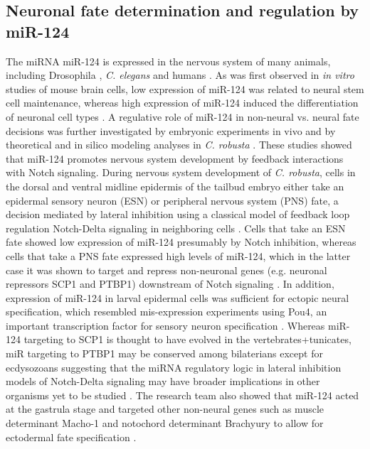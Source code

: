 \documentclass[graybox]{svmult}
\begin{document}
\subsection{Neuronal fate determination and regulation by miR-124}

The miRNA miR-124 is expressed in the nervous system of many animals, including 
Drosophila \citep{Aboobaker18017}, \textit{C. elegans} \citep{Clark:2010} and 
humans \citep{Sempere2004}. As was first observed in \textit{in vitro} studies 
of mouse 
brain cells, low expression of miR-124 was related to neural stem cell 
maintenance, whereas high expression of miR-124 induced the differentiation of 
neuronal cell types \citep{Cheng:2009qf}. A regulative role of 
miR-124 in non-neural vs. neural fate decisions was further investigated by 
embryonic experiments in vivo \citep{Chen4943} and by 
theoretical and in silico modeling analyses in \textit{C. robusta} 
\citep{Chen2014}. These studies showed that miR-124 promotes 
nervous system development by feedback interactions with Notch signaling. 
During nervous system development of \textit{C. robusta}, cells in the dorsal 
and ventral midline epidermis of the tailbud embryo either take an epidermal 
sensory neuron (ESN) or peripheral nervous system (PNS) fate, a decision 
mediated by lateral inhibition using a classical model of feedback loop 
regulation Notch-Delta signaling in neighboring cells \citep{Collier:1996, 
Chen2014}. Cells that take an ESN fate showed low expression of miR-124 
presumably by Notch inhibition, whereas cells that take a PNS fate expressed 
high levels of miR-124, which in the latter case it was shown to target and 
repress non-neuronal genes (e.g. neuronal repressors SCP1 and PTBP1) downstream 
of Notch signaling \citep{Chen4943}. In addition, expression 
of miR-124 in larval epidermal cells was sufficient for ectopic neural 
specification, which resembled mis-expression experiments using Pou4, an 
important transcription factor for sensory neuron specification 
\citep{Chen4943, JoyceTang2013}. Whereas miR-124 targeting to SCP1 is thought to 
have evolved in the vertebrates+tunicates, miR targeting to PTBP1 may be 
conserved among bilaterians except for ecdysozoans \citep{Chen4943} suggesting 
that the miRNA regulatory logic in lateral inhibition models of Notch-Delta 
signaling may have broader implications in other organisms yet to be studied 
\citep{Chen2014}. The research team also showed that miR-124 
acted at the gastrula stage and targeted other non-neural genes such as muscle 
determinant Macho-1 and notochord determinant Brachyury to allow for ectodermal 
fate specification \citep{Chen4943}.
\end{document}
